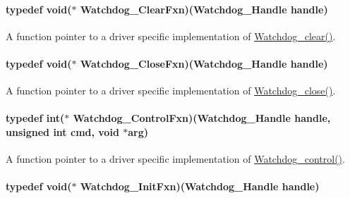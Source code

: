 \paragraph[{Watchdog\-\_\-\-Clear\-Fxn}]{\setlength{\rightskip}{0pt plus 5cm}typedef void($\ast$ Watchdog\-\_\-\-Clear\-Fxn)({\bf Watchdog\-\_\-\-Handle} handle)}\label{_watchdog_8h_a23a5b26733f63039daa93378d5307a7d}


A function pointer to a driver specific implementation of \hyperlink{_watchdog_8h_a396decd6b1807db10c636f9987c3be4c}{Watchdog\-\_\-clear()}. 

\paragraph[{Watchdog\-\_\-\-Close\-Fxn}]{\setlength{\rightskip}{0pt plus 5cm}typedef void($\ast$ Watchdog\-\_\-\-Close\-Fxn)({\bf Watchdog\-\_\-\-Handle} handle)}\label{_watchdog_8h_a52c6b4db063cd428c000c7951175f197}


A function pointer to a driver specific implementation of \hyperlink{_watchdog_8h_a1c0dfea7011b06f303d01afb631ffbdd}{Watchdog\-\_\-close()}. 

\paragraph[{Watchdog\-\_\-\-Control\-Fxn}]{\setlength{\rightskip}{0pt plus 5cm}typedef int($\ast$ Watchdog\-\_\-\-Control\-Fxn)({\bf Watchdog\-\_\-\-Handle} handle, unsigned int cmd, void $\ast$arg)}\label{_watchdog_8h_a36965c48da25f952175822d0f81e1a0a}


A function pointer to a driver specific implementation of \hyperlink{_watchdog_8h_aa98a75361edb1e476432669169f2950e}{Watchdog\-\_\-control()}. 

\paragraph[{Watchdog\-\_\-\-Init\-Fxn}]{\setlength{\rightskip}{0pt plus 5cm}typedef void($\ast$ Watchdog\-\_\-\-Init\-Fxn)({\bf Watchdog\-\_\-\-Handle} handle)}\label{_watchdog_8h_a21594bd6db5b508572ae7d380b8fae10}


